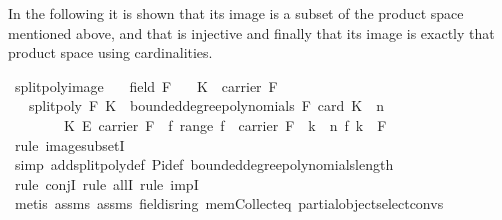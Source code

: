 \begin{isabellebody}
\begin{isamarkuptext}
In the following it is shown that its image is a subset of the product space mentioned above, and
that  is injective and finally that its image is exactly that product space
using cardinalities.%
\end{isamarkuptext}\isamarkuptrue%
\isamarkupfalse%
\ split{\isacharunderscore}{\kern0pt}poly{\isacharunderscore}{\kern0pt}image{\isacharcolon}{\kern0pt}\isanewline
\ \ \ {\isachardoublequoteopen}field\ F{\isachardoublequoteclose}\isanewline
\ \ \ {\isachardoublequoteopen}K\ {\isasymsubseteq}\ carrier\ F{\isachardoublequoteclose}\isanewline
\ \ \ {\isachardoublequoteopen}split{\isacharunderscore}{\kern0pt}poly\ F\ K\ {\isacharbackquote}{\kern0pt}\ bounded{\isacharunderscore}{\kern0pt}degree{\isacharunderscore}{\kern0pt}polynomials\ F\ {\isacharparenleft}{\kern0pt}card\ K\ {\isacharplus}{\kern0pt}\ n{\isacharparenright}{\kern0pt}\ {\isasymsubseteq}\isanewline
\ \ \ \ \ \ \ \ {\isacharparenleft}{\kern0pt}K\ {\isasymrightarrow}\isactrlsub E\ carrier\ F{\isacharparenright}{\kern0pt}\ {\isasymtimes}\ {\isacharbraceleft}{\kern0pt}f{\isachardot}{\kern0pt}\ range\ f\ {\isasymsubseteq}\ carrier\ F\ {\isasymand}\ {\isacharparenleft}{\kern0pt}{\isasymforall}k\ {\isasymge}\ n{\isachardot}{\kern0pt}\ f\ k\ {\isacharequal}{\kern0pt}\ {\isasymzero}\isactrlbsub F\isactrlesub {\isacharparenright}{\kern0pt}{\isacharbraceright}{\kern0pt}{\isachardoublequoteclose}\ \isanewline
%
\isadelimproof
\ \ %
\endisadelimproof
%
\isatagproof
{}\isamarkupfalse%
\ {\isacharparenleft}{\kern0pt}rule\ image{\isacharunderscore}{\kern0pt}subsetI{\isacharparenright}{\kern0pt}\isanewline
\ \ \isamarkupfalse%
\ {\isacharparenleft}{\kern0pt}simp\ add{\isacharcolon}{\kern0pt}split{\isacharunderscore}{\kern0pt}poly{\isacharunderscore}{\kern0pt}def\ Pi{\isacharunderscore}{\kern0pt}def\ bounded{\isacharunderscore}{\kern0pt}degree{\isacharunderscore}{\kern0pt}polynomials{\isacharunderscore}{\kern0pt}length{\isacharparenright}{\kern0pt}\isanewline
\ \ \isamarkupfalse%
\ {\isacharparenleft}{\kern0pt}rule\ conjI{\isacharcomma}{\kern0pt}\ rule\ allI{\isacharcomma}{\kern0pt}\ rule\ impI{\isacharparenright}{\kern0pt}\ \ \isanewline
\ \ \ \isamarkupfalse%
\ {\isacharparenleft}{\kern0pt}metis\ assms{\isacharparenleft}{\kern0pt}{}{\isacharparenright}{\kern0pt}\ assms{\isacharparenleft}{\kern0pt}{}{\isacharparenright}{\kern0pt}\ field{\isachardot}{\kern0pt}is{\isacharunderscore}{\kern0pt}ring\ mem{\isacharunderscore}{\kern0pt}Collect{\isacharunderscore}{\kern0pt}eq\ partial{\isacharunderscore}{\kern0pt}object{\isachardot}{\kern0pt}select{\isacharunderscore}{\kern0pt}convs{\isacharparenleft}{\kern0pt}{}{\isacharparenright}{\kern0pt}\ \isanewline

\end{isabellebody}
